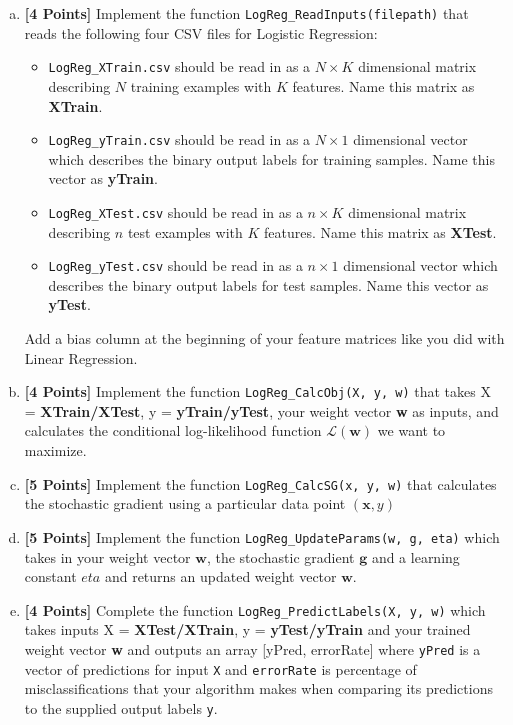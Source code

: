 \documentclass[a4paper]{article}
\theoremstyle{definition}
\def\x{\mathbf x}
\def\w{\mathbf w}
\newcommand \code [1]{{\tt #1}}
\begin{document}
\begin{enumerate}[(a)]

\item {\bf [4 Points]} Implement the function \code{LogReg\_ReadInputs(filepath)} that reads the following four CSV files for Logistic Regression:

\begin{itemize}
\item \code{LogReg\_XTrain.csv} should be read in as a $N \times K$ dimensional matrix describing $N$ training examples with $K$ features. Name this matrix as \textbf{XTrain}.
\item\code{LogReg\_yTrain.csv} should be read in as a $N \times 1$ dimensional vector which describes the binary output labels for training samples. Name this vector as \textbf{yTrain}.
\item \code{LogReg\_XTest.csv} should be read in as a $n \times K$ dimensional matrix describing $n$ test examples with $K$ features. Name this matrix as \textbf{XTest}.
\item \code{LogReg\_yTest.csv} should be read in as a $n \times 1$ dimensional vector which describes the binary output labels for test samples. Name this vector as \textbf{yTest}.
\end{itemize}

Add a bias column at the beginning of your feature matrices like you did with Linear Regression.
\\
\item {\bf [4 Points]} Implement the function \code{LogReg\_CalcObj(X, y, w)} that takes X = \textbf{XTrain/XTest}, y = \textbf{yTrain/yTest}, your weight vector \textbf{w} as inputs, and calculates the conditional log-likelihood function $\mathcal{L}(\w)$ we want to maximize.\\

\item {\bf [5 Points]} Implement the function \code{LogReg\_CalcSG(x, y, w)} that calculates the stochastic gradient using a particular data point $(\x,y)$\\

\item {\bf [5 Points]} Implement the function \code{LogReg\_UpdateParams(w, g, eta)} which takes in your weight vector $\w$, the stochastic gradient $\mathbf{g}$ and a learning constant $eta$ and returns an updated weight vector $\w$.\\

\item {\bf [4 Points]} Complete the function \code{LogReg\_PredictLabels(X, y, w)} which takes inputs X = \textbf{XTest/XTrain}, y = \textbf{yTest/yTrain} and your trained weight vector \textbf{w} and outputs an array [yPred, errorRate] where \code{yPred} is a vector of predictions for input \code{X} and \code{errorRate} is percentage of misclassifications that your algorithm makes when comparing its predictions to the supplied output labels \code{y}.\\


\end{enumerate}
\end{document}
